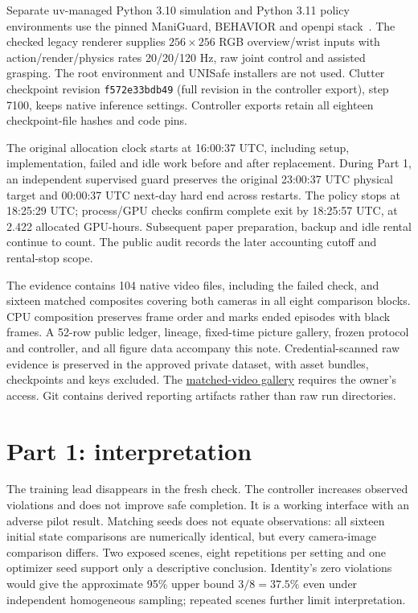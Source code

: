\documentclass[sigconf,dvipsnames]{acmart}
\begin{document}
Separate uv-managed Python 3.10 simulation and Python 3.11 policy environments use the
pinned ManiGuard, BEHAVIOR and openpi stack~\cite{openpi}. The checked legacy renderer
supplies $256\times256$ RGB overview/wrist inputs with action/render/physics rates
20/20/120 Hz, raw joint control and assisted grasping. The root environment and
UNISafe installers are not used. Clutter checkpoint revision
\texttt{f572e33bdb49} (full revision in the controller export), step 7100, keeps native inference
settings. Controller exports retain all eighteen checkpoint-file hashes and code pins.

The original allocation clock starts at 16:00:37 UTC, including setup, implementation,
failed and idle work before and after replacement. During Part 1, an independent supervised guard preserves the original
23:00:37 UTC physical target and 00:00:37 UTC next-day hard end across restarts. The policy stops at 18:25:29 UTC; process/GPU checks confirm complete exit
by 18:25:57 UTC, at 2.422 allocated GPU-hours. Subsequent paper preparation, backup
and idle rental continue to count. The public audit records the later accounting
cutoff and rental-stop scope.

The evidence contains 104 native video files, including the failed check, and sixteen
matched composites covering both cameras in all eight comparison blocks. CPU
composition preserves frame order and marks ended episodes with black frames.
A 52-row public ledger, lineage, fixed-time picture gallery, frozen protocol and
controller, and all figure data accompany this note. Credential-scanned raw evidence
is preserved in the approved private dataset, with asset bundles, checkpoints and
keys excluded. The \href{https://huggingface.co/datasets/Sachioster/safety-dial-phase3-part1-20261018/tree/17dbdcb7e29a71c763f6441ac4aa8d0c7fcf6647/matched-videos}{matched-video gallery}
requires the owner's access. Git contains derived reporting artifacts rather than
raw run directories.

\section{Part 1: interpretation}
The training lead disappears in the fresh check. The controller increases observed
violations and does not improve safe completion. It is a working interface with an
adverse pilot result. Matching seeds does not equate observations: all sixteen initial
state comparisons are numerically identical, but every camera-image comparison
differs. Two exposed scenes, eight repetitions per setting and one optimizer seed
support only a descriptive conclusion. Identity's zero violations would give the
approximate 95\% upper bound $3/8=37.5\%$ even under independent homogeneous sampling;
repeated scenes further limit interpretation.
\end{document}
